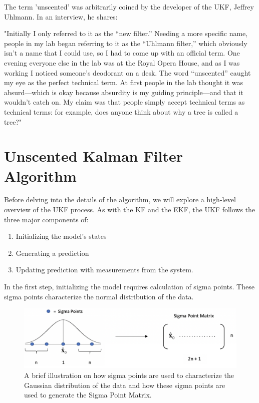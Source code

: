 \newpage

\noindent The term 'unscented' was arbitrarily coined by the developer of the UKF, Jeffrey Uhlmann. In an interview, he shares:
\begin{displayquote}
"Initially I only referred to it as the “new filter.” Needing a more specific name, people in my lab began referring to it as the “Uhlmann filter,” which obviously isn’t a name that I could use, so I had to come up with an official term. One evening everyone else in the lab was at the Royal Opera House, and as I was working I noticed someone’s deodorant on a desk. The word “unscented” caught my eye as the perfect technical term. At first people in the lab thought it was absurd—which is okay because absurdity is my guiding principle—and that it wouldn’t catch on. My claim was that people simply accept technical terms as technical terms: for example, does anyone think about why a tree is called a tree?"
\end{displayquote}


\section{Unscented Kalman Filter Algorithm}
Before delving into the details of the algorithm, we will explore a high-level overview of the UKF process. As with the KF and the EKF, the UKF follows the three major components of:
\begin{enumerate}
  \item Initializing the model's states
  \item Generating a prediction
  \item Updating prediction with measurements from the system.
\end{enumerate}

\noindent In the first step, initializing the model requires calculation of sigma points. These sigma points characterize the normal distribution of the data. 
\begin{figure}[h]
    \centering
    \includegraphics[scale = 0.4]{SPM.png}
    \caption{A brief illustration on how sigma points are used to characterize the Gaussian distribution of the data and how these sigma points are used to generate the Sigma Point Matrix.}
\end{figure}

